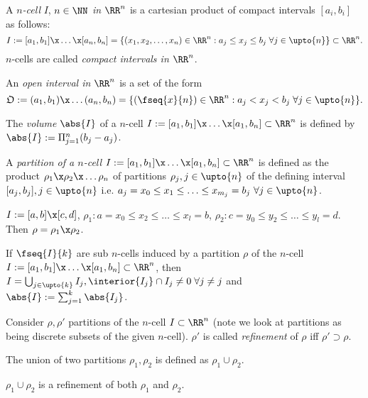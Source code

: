 \begin{defn}[$n$-cell]
  A \emph{$n$-cell} $I$, $n\in\NN$ \emph{in $\RR^n$} is a cartesian product of compact intervals $[a_i, b_i]$ as follows: $$I:=[a_1,b_1]\x \ldots\x [a_n, b_n]=\{(x_1, x_2,\ldots,x_n)\in\RR^n:a_j\leq x_j\leq b_j\;\forall j\in\upto{n}\}\subset\RR^n.$$
  $n$-cells are called \emph{compact intervals in $\RR^n$}. 
\end{defn}
\begin{defn}
  An \emph{open interval in $\RR^n$} is a set of the form $$\mathfrak{O}:=(a_1, b_1)\x \ldots (a_n, b_n)=\{(\fseq{x}{n})\in\RR^n:a_j<x_j<b_j\;\forall j\in\upto{n}\}.$$
\end{defn}
\begin{defn}
  The \emph{volume} $\abs{I}$ of a $n$-cell $I:=[a_1, b_1]\x\ldots \x[a_1, b_n]\subset \RR^n$ is defined by $\abs{I}:=\Pi_{j=1}^n (b_j-a_j)$.
\end{defn}
\begin{defn}
  A \emph{partition of a $n$-cell} $I:=[a_1, b_1]\x\ldots \x[a_1, b_n]\subset \RR^n$
   is defined as the product $\rho_1\x\rho_2\x\ldots\rho_n$ of partitions $\rho_j, j\in\upto{n}$ of the defining interval $[a_j,b_j], j\in\upto{n}$ i.e. $a_j=x_0\leq x_1\leq\ldots\leq x_{m_j}=b_j\ \forall j\in\upto{n}$.
\end{defn}
\begin{exam}
  $I:=[a,b]\x [c,d]$, $\rho_1:a=x_0\leq x_2\leq \ldots \leq x_l=b$, $\rho_2:c=y_0\leq y_2\leq \ldots \leq y_l=d$. Then $\rho=\rho_1\x \rho_2$.
\end{exam}
\begin{rem}
  If $\fseq{I}{k}$ are sub $n$-cells induced by a partition $\rho$ of the $n$-cell $I:=[a_1, b_1]\x\ldots \x[a_1, b_n]\subset \RR^n$, then $I=\bigcup_{j\in\upto{k}}I_j, \interior{I_j}\cap I_j\neq 0\;\forall j\neq j$ and $\abs{I}:=\sum_{j=1}^{k}\abs{I_j}$.
\end{rem}
\begin{defn}[refinement]
  Consider $\rho, \rho'$ partitions of the $n$-cell $I\subset\RR^n$ (note we look at partitions as being discrete subsets of the given $n$-cell). $\rho'$ is called \emph{refinement} of $\rho$ iff $\rho'\supset \rho$.
\end{defn}
\begin{defn}
  The union of two partitions $\rho_1, \rho_2$ is defined as $\rho_1\cup \rho_2$. 
\end{defn}
\begin{defn}
  $\rho_1\cup \rho_2$ is a refinement of both $\rho_1$ and $\rho_2$.
\end{defn}
